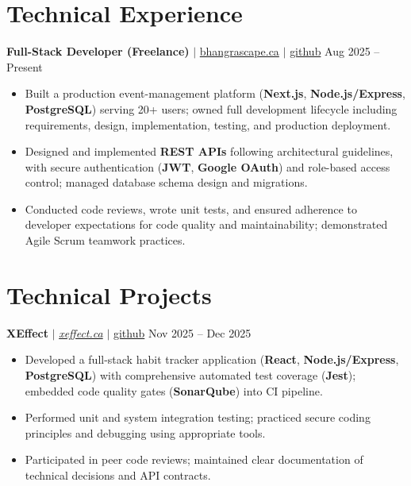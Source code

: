 \documentclass[11pt,a4paper]{article}
\begin{document}
\section{Technical Experience}

\textbf{Full-Stack Developer (Freelance)} $|$ \href{https://bhangrascape.ca}{bhangrascape.ca} $|$ \href{https://github.com/bhat0155/bhangraescape}{\small github} \hfill Aug 2025 -- Present
\begin{itemize}
    \item Built a production event-management platform (\textbf{Next.js}, \textbf{Node.js/Express}, \textbf{PostgreSQL}) serving 20+ users; owned full development lifecycle including requirements, design, implementation, testing, and production deployment.
    \item Designed and implemented \textbf{REST APIs} following architectural guidelines, with secure authentication (\textbf{JWT}, \textbf{Google OAuth}) and role-based access control; managed database schema design and migrations.
    \item Conducted code reviews, wrote unit tests, and ensured adherence to developer expectations for code quality and maintainability; demonstrated Agile Scrum teamwork practices.
\end{itemize}

\section{Technical Projects}

\textbf{XEffect} $|$ \href{https://www.xeffect.ca/app}{\emph{xeffect.ca}} $|$ \href{https://github.com/bhat0155/xeffect}{\small github} \hfill Nov 2025 -- Dec 2025
\begin{itemize}
    \item Developed a full-stack habit tracker application (\textbf{React}, \textbf{Node.js/Express}, \textbf{PostgreSQL}) with comprehensive automated test coverage (\textbf{Jest}); embedded code quality gates (\textbf{SonarQube}) into CI pipeline.
    \item Performed unit and system integration testing; practiced secure coding principles and debugging using appropriate tools.
    \item Participated in peer code reviews; maintained clear documentation of technical decisions and API contracts.
\end{itemize}
\end{document}
